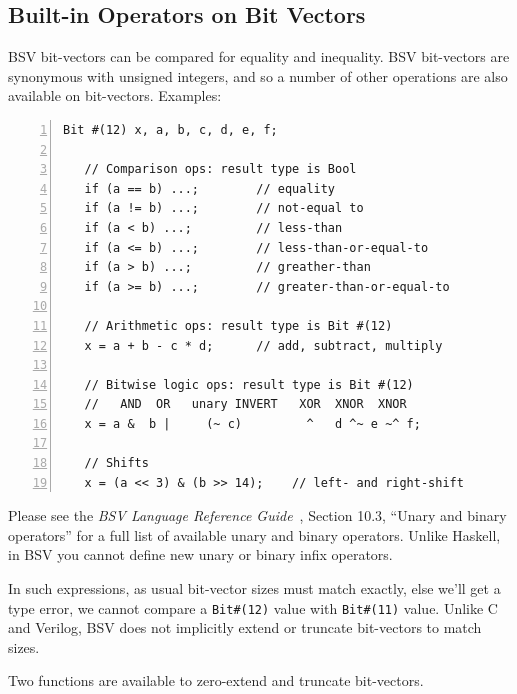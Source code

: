 
\subsection{Built-in Operators on Bit Vectors}

\label{Bit_Vector_Ops}

BSV bit-vectors can be compared for equality and inequality.  BSV
bit-vectors are synonymous with unsigned integers, and so a number of
other operations are also available on bit-vectors.  Examples:


{\small
\begin{Verbatim}[frame=single, numbers=left]
   Bit #(12) x, a, b, c, d, e, f;

   // Comparison ops: result type is Bool
   if (a == b) ...;        // equality
   if (a != b) ...;        // not-equal to
   if (a < b) ...;         // less-than
   if (a <= b) ...;        // less-than-or-equal-to
   if (a > b) ...;         // greather-than
   if (a >= b) ...;        // greater-than-or-equal-to

   // Arithmetic ops: result type is Bit #(12)
   x = a + b - c * d;      // add, subtract, multiply

   // Bitwise logic ops: result type is Bit #(12)
   //   AND  OR   unary INVERT   XOR  XNOR  XNOR
   x = a &  b |     (~ c)         ^   d ^~ e ~^ f;

   // Shifts
   x = (a << 3) & (b >> 14);    // left- and right-shift
\end{Verbatim}
}

Please see the \emph{BSV Language Reference Guide}~\cite{BLang2000},
Section 10.3, ``Unary and binary operators'' for a full list of
available unary and binary operators.  Unlike Haskell, in BSV you
cannot define new unary or binary infix operators.

In such expressions, as usual bit-vector sizes must match exactly,
else we'll get a type error, {\eg} we cannot compare a
\verb|Bit#(12)| value with \verb|Bit#(11)| value.  Unlike C and
Verilog, BSV does not implicitly extend or truncate bit-vectors to
match sizes.


Two functions are available to zero-extend and truncate bit-vectors.

